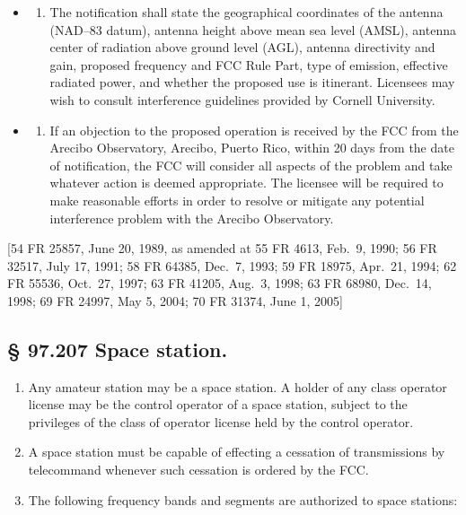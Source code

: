 \documentclass[
  letterpaper,
  DIV=11,
  numbers=noendperiod]{scrreport}
\providecommand{\tightlist}{%
  \setlength{\itemsep}{0pt}\setlength{\parskip}{0pt}}\usepackage{longtable,booktabs,array}
\begin{document}
\begin{itemize}
\item
  \begin{enumerate}
  \def\labelenumi{(\arabic{enumi})}
  \tightlist
  \item
    The notification shall state the geographical coordinates of the
    antenna (NAD--83 datum), antenna height above mean sea level (AMSL),
    antenna center of radiation above ground level (AGL), antenna
    directivity and gain, proposed frequency and FCC Rule Part, type of
    emission, effective radiated power, and whether the proposed use is
    itinerant. Licensees may wish to consult interference guidelines
    provided by Cornell University.
  \end{enumerate}
\item
  \begin{enumerate}
  \def\labelenumi{(\arabic{enumi})}
  \setcounter{enumi}{1}
  \tightlist
  \item
    If an objection to the proposed operation is received by the FCC
    from the Arecibo Observatory, Arecibo, Puerto Rico, within 20 days
    from the date of notification, the FCC will consider all aspects of
    the problem and take whatever action is deemed appropriate. The
    licensee will be required to make reasonable efforts in order to
    resolve or mitigate any potential interference problem with the
    Arecibo Observatory.
  \end{enumerate}
\end{itemize}

{[}54 FR 25857, June 20, 1989, as amended at 55 FR 4613, Feb.~9, 1990;
56 FR 32517, July 17, 1991; 58 FR 64385, Dec.~7, 1993; 59 FR 18975,
Apr.~21, 1994; 62 FR 55536, Oct.~27, 1997; 63 FR 41205, Aug.~3, 1998; 63
FR 68980, Dec.~14, 1998; 69 FR 24997, May 5, 2004; 70 FR 31374, June 1,
2005{]}

\hypertarget{97.207}{%
\subsection*{§ 97.207 Space station.}\label{97.207}}

\begin{enumerate}
\def\labelenumi{(\alph{enumi})}
\item
  Any amateur station may be a space station. A holder of any class
  operator license may be the control operator of a space station,
  subject to the privileges of the class of operator license held by the
  control operator.
\item
  A space station must be capable of effecting a cessation of
  transmissions by telecommand whenever such cessation is ordered by the
  FCC.
\item
  The following frequency bands and segments are authorized to space
  stations:
\end{enumerate}
\end{document}

